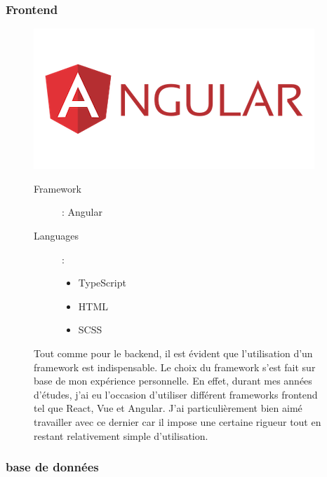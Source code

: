 \subsubsection{Frontend}
\begin{figure}[H]
  \begin{minipage}{.3\textwidth}
    \includegraphics[width=0.75\linewidth]{img/tech/Angular.png}
  \end{minipage}
  \begin{minipage}{.7\textwidth}
    \begin{description}
      \item[Framework]: Angular
      \item[Languages]: \begin{itemize}
        \item TypeScript
        \item HTML
        \item SCSS
      \end{itemize} 
    \end{description}
    Tout comme pour le backend, il est évident que l'utilisation d'un framework est indispensable. Le choix du framework s'est fait sur base de mon expérience personnelle. En effet, durant mes années d'études, j'ai eu l'occasion d'utiliser différent frameworks frontend tel que React, Vue et Angular. J'ai particulièrement bien aimé travailler avec ce dernier car il impose une certaine rigueur tout en restant relativement simple d'utilisation.
  \end{minipage}
\end{figure}

\newpage

\subsubsection{base de données}

